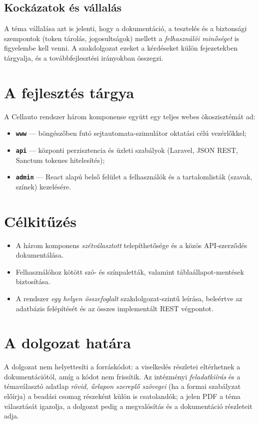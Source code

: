 \subsection{Kockázatok és vállalás}
A téma vállalása azt is jelenti, hogy a dokumentáció, a tesztelés és a biztonsági szempontok (token tárolás, jogosultságok) mellett a \emph{felhasználói minőséget} is figyelembe kell venni. A szakdolgozat ezeket a kérdéseket külön fejezetekben tárgyalja, és a továbbfejlesztési irányokban összegzi.

\section{A fejlesztés tárgya}
A Cellauto rendszer három komponense együtt egy teljes webes ökoszisztémát ad:
\begin{itemize}
  \item \textbf{\texttt{www}} — böngészőben futó sejtautomata-szimulátor oktatási célú vezérlőkkel;
  \item \textbf{\texttt{api}} — központi perzisztencia és üzleti szabályok (Laravel, JSON REST, Sanctum tokenes hitelesítés);
  \item \textbf{\texttt{admin}} — React alapú belső felület a felhasználók és a tartalomlisták (szavak, színek) kezelésére.
\end{itemize}

\section{Célkitűzés}
\begin{itemize}
  \item A három komponens \emph{szétválasztott} telepíthetősége és a közös API-szerződés dokumentálása.
  \item Felhasználóhoz kötött szó- és színpaletták, valamint táblaállapot-mentések biztosítása.
  \item A rendszer \emph{egy helyen összefoglalt} szakdolgozat-szintű leírása, beleértve az adatbázis felépítését és az összes implementált REST végpontot.
\end{itemize}

\section{A dolgozat határa}
A dolgozat nem helyettesíti a forráskódot: a viselkedés részletei eltérhetnek a dokumentációtól, amíg a kódot nem frissítik. Az intézményi \emph{feladatkiírás} és a témaválasztó adatlap \emph{rövid, űrlapon szereplő szövegei} (ha a formai szabályzat előírja) a beadási csomag részeként külön is csatolandók; a jelen PDF a téma választását igazolja, a dolgozat pedig a megvalósítás és a dokumentáció részleteit adja.

